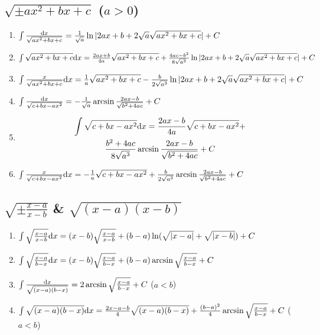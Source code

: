 	\subsection{$\sqrt{\pm ax^2+bx+c}$ ($a>0$)}

	\begin{enumerate}

	\item $ \int \frac{\mathrm{d} x}{\sqrt{ax^2+bx+c}} = \frac{1}{\sqrt{a}} \ln | 2ax+b+2\sqrt{a}\sqrt{ax^2+bx+c} | + C $

	\item $ \int \sqrt{ax^2+bx+c} \mathrm{d} x = \frac{2ax+b}{4a}\sqrt{ax^2+bx+c} +
		\frac{4ac-b^2}{8\sqrt{a^3}}\ln |2ax+b+2\sqrt{a}\sqrt{ax^2+bx+c}| + C $

	\item $ \int \frac{x}{\sqrt{ax^2+bx+c}} \mathrm{d} x = \frac{1}{a}\sqrt{ax^2+bx+c} -
		\frac{b}{2\sqrt{a^3}}\ln | 2ax+b+2\sqrt{a}\sqrt{ax^2+bx+c} | + C $

	\item $ \int \frac{\mathrm{d} x}{\sqrt{c+bx-ax^2}} = -\frac{1}{\sqrt{a}} \arcsin \frac{2ax-b}{\sqrt{b^2+4ac}} + C  $

	\item \begin{gather*}
		\int \sqrt{c+bx-ax^2} \mathrm{d} x = \frac{2ax-b}{4a}\sqrt{c+bx-ax^2} +\\
		\frac{b^2+4ac}{8\sqrt{a^3}}\arcsin\frac{2ax-b}{\sqrt{b^2+4ac}} + C
	\end{gather*}

	\item $ \int \frac{x}{\sqrt{c+bx-ax^2}} \mathrm{d} x = -\frac{1}{a}\sqrt{c+bx-ax^2} + \frac{b}{2\sqrt{a^3}}\arcsin\frac{2ax-b}{\sqrt{b^2+4ac}} + C $

	\end{enumerate}

	\subsection{$\sqrt{\pm\frac{x-a}{x-b}}$ \& $\sqrt{(x-a)(x-b)}$}

	\begin{enumerate}

	\item $ \int \sqrt\frac{x-a}{x-b} \mathrm{d} x = (x-b)\sqrt\frac{x-a}{x-b} + (b-a)\ln(\sqrt{|x-a|}+\sqrt{|x-b|}) + C $

	\item $ \int \sqrt\frac{x-a}{b-x} \mathrm{d} x = (x-b)\sqrt\frac{x-a}{b-x} + (b-a)\arcsin\sqrt\frac{x-a}{b-x} + C $

	\item $ \int \frac{\mathrm{d} x}{\sqrt{(x-a)(b-x)}} = 2\arcsin\sqrt\frac{x-a}{b-x} + C$ ($a<b$)

	\item $ \int \sqrt{(x-a)(b-x)} \mathrm{d} x = \frac{2x-a-b}{4}\sqrt{(x-a)(b-x)} + \frac{(b-a)^2}{4}\arcsin\sqrt\frac{x-a}{b-x} + C $ ($a<b$)

	\end{enumerate}

